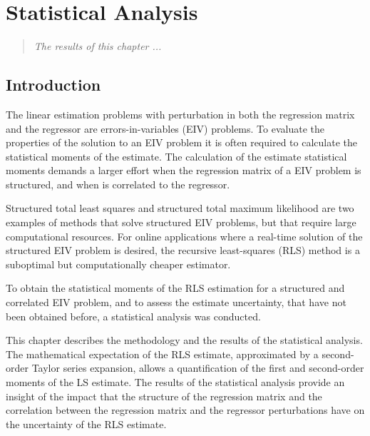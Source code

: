 
\glsresetall

\chapter{Statistical Analysis}\label{chap:StatisticalAnalysis}

\begin{quote}
\emph{The results of this chapter ...}\vfill{}
\end{quote}



\section{Introduction}

The linear estimation problems with perturbation in both the regression matrix and the regressor are errors-in-variables (EIV) problems.
To evaluate the properties of the solution to an EIV problem it is often required to calculate the statistical moments of the estimate.
The calculation of the estimate statistical moments demands a larger effort when the regression matrix of a EIV problem is structured, and when is correlated to the regressor.

Structured total least squares and structured total maximum likelihood are two examples of methods that solve structured EIV problems, but that require large computational resources.
For online applications where a real-time solution of the structured EIV problem is desired, the recursive least-squares (RLS) method is a suboptimal but computationally cheaper estimator.

To obtain the statistical moments of the RLS estimation for a structured and correlated EIV problem, and to assess the estimate uncertainty, that have not been obtained before, a statistical analysis was conducted.

This chapter describes the methodology and the results of the statistical analysis.
The mathematical expectation of the RLS estimate, approximated by a second-order Taylor series expansion, allows a quantification of the first and second-order moments of the LS estimate.
The results of the statistical analysis provide an insight of the impact that the structure of the regression matrix and the correlation between the regression matrix and the regressor perturbations have on the uncertainty of the RLS estimate.

